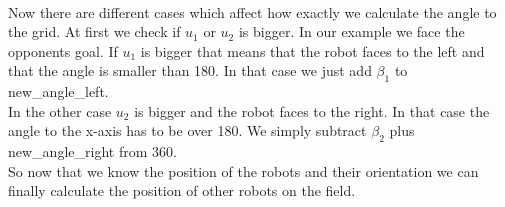 \documentclass[lnicst,a4paper]{svmultln}
\begin{document}
\\
Now there are different cases which affect how exactly we calculate the angle to the grid. At first we check if \(u_{1}\) or \(u_{2}\) is bigger. In our example we face the opponents goal. If \(u_{1}\) is bigger that means that the robot faces to the left and that the angle is smaller than 180\degree. In that case we just add \(\beta_{1}\) to new\_angle\_left.
\\
In the other case \(u_{2}\) is bigger and the robot faces to the right. In that case the angle to the x-axis has to be over 180\degree. We simply subtract \(\beta_{2}\) plus new\_angle\_right from 360\degree.
\\
So now that we know the position of the robots and their orientation we can finally calculate the position of other robots on the field.
\end{document}

